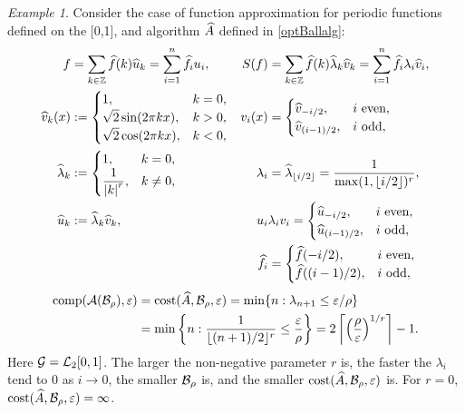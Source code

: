 \documentclass[final]{elsarticle}
\theoremstyle{definition}
\theoremstyle{remark}
\newtheorem{exmp}{Example}
\begin{document}
\begin{exmp} Consider the case of function approximation for periodic functions defined on the [0,1], and algorithm $\widehat{A}$ defined in \eqref{optBallalg}:
	\begin{align*}
	f &= \sum_{k \in \mathbb{Z}} \widehat{f}(k) \widehat{u}_{k}  = \sum_{i=1}^n \widehat{f}_i u_i, 
	& S(f) & = \sum_{k \in \mathbb{Z}} \widehat{f}(k) \widehat{\lambda}_k \widehat{v}_k = \sum_{i=1}^n \widehat{f}_i \lambda_i \widehat{v}_i, \\
	\widehat{v}_{k} (x) &:= \begin{cases} 1, & k = 0, \\
	\displaystyle \sqrt{2} \sin(2\pi k x), & k > 0, \\
	\displaystyle \sqrt{2} \cos(2\pi k x), & k < 0, \\
	\end{cases} 
	& v_i(x) &= \begin{cases} \widehat{v}_{-i/2}, & i \text{ even},\\
	\widehat{v}_{(i-1)/2}, & i \text{ odd},
	\end{cases} \\
	\widehat{\lambda}_{k} &:= \begin{cases} 1, & k = 0, \\
	\displaystyle \frac{1}{\left \lvert k \right \rvert^r}, & k \ne 0,
	\end{cases}
	& \lambda_i &= \widehat{\lambda}_{\lfloor i/2\rfloor} = \frac{1}{\max(1,\lfloor i/2\rfloor)^r}, \\
	\widehat{u}_{k} &:=  \widehat{\lambda}_k \widehat{v}_k,
	& u_i & \lambda_i v_i = \begin{cases} \widehat{u}_{-i/2}, & i \text{ even},\\
	\widehat{u}_{(i-1)/2}, & i \text{ odd},
	\end{cases}
	\\
	&&\widehat{f}_i& = \begin{cases} \widehat{f}(-i/2), & i \text{ even},\\
	\widehat{f}((i-1)/2), & i \text{ odd},
	\end{cases}
	\end{align*}
	\begin{align*}
	\operatorname{comp}(\mathcal{A}(\mathcal{B}_{\rho}),\varepsilon) &= \operatorname{cost}(\widehat{A},\mathcal{B}_{\rho},\varepsilon) 
	=\min\{ n : \lambda_{n+1} \le \varepsilon/\rho \} \\
	& = \min \left\{ n : \frac{1}{\lfloor (n+1)/2 \rfloor^r} \le \frac{\varepsilon}{\rho} \right\} 
	= 2 \left \lceil \left(\frac{\rho}{\varepsilon} \right)^{1/r} \right \rceil - 1.
	\end{align*}
	Here $\mathcal{G}=\mathcal{L}_2[0,1]$.  The larger the non-negative parameter $r$ is, the faster the $\lambda_i$ tend to 0 as $ i \to 0$, the smaller $\mathcal{B}_\rho$ is, and the smaller  $\operatorname{cost}(\widehat{A},\mathcal{B}_{\rho},\varepsilon)$ is.  For $r = 0$, $\operatorname{cost}(\widehat{A},\mathcal{B}_{\rho},\varepsilon) = \infty$.
\end{exmp}
\end{document}

